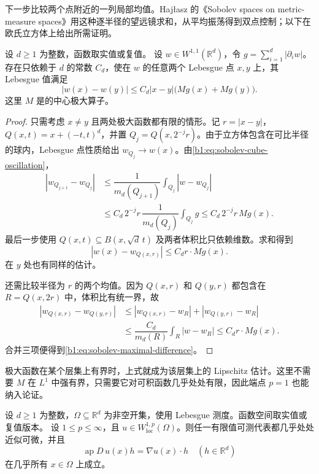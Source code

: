 下一步比较两个点附近的一列局部均值。Hajłasz 的《Sobolev spaces on metric-measure spaces》\cite[Section 9, Theorem 9.4]{Hajlasz2003SobolevMetric}用这种逐半径的望远镜求和，从平均振荡得到双点控制；以下在欧氏立方体上给出所需证明。

\begin{proposition}\label{b1:prop:sobolev-maximal-difference}
设 \(d\geq1\) 为整数，函数取实值或复值。
设 \(w\in W^{1,1}(\mathbb R^d)\)，令 \(g=\sum_{i=1}^d|\partial_iw|\)。存在只依赖于 \(d\) 的常数 \(C_d\)，使在 \(w\) 的任意两个 Lebesgue 点 \(x,y\) 上，其 Lebesgue 值满足
\begin{equation}\label{b1:eq:sobolev-maximal-difference}
 |w(x)-w(y)|\leq C_d|x-y|\bigl(Mg(x)+Mg(y)\bigr).
\end{equation}
这里 \(M\) 是的中心极大算子。
\end{proposition}
\begin{proof}
只需考虑 \(x\ne y\) 且两处极大函数都有限的情形。记 \(r=|x-y|\)，\(Q(x,t)=x+(-t,t)^d\)，并置 \(Q_j=Q(x,2^{-j}r)\)。由于立方体包含在可比半径的球内，Lebesgue 点性质给出 \(w_{Q_j}\rightarrow w(x)\)。由\eqref{b1:eq:sobolev-cube-oscillation}，
\[
 \begin{aligned}
 |w_{Q_{j+1}}-w_{Q_j}|
 &\leq\dfrac1{m_d(Q_{j+1})}\int_{Q_j}|w-w_{Q_j}|\\
 &\leq C_d\,2^{-j}r\,\dfrac1{m_d(Q_j)}\int_{Q_j}g
 \leq C_d\,2^{-j}r\,Mg(x).
 \end{aligned}
\]
最后一步使用 \(Q(x,t)\subseteq B(x,\sqrt d\,t)\) 及两者体积比只依赖维数。求和得到
\[
 |w(x)-w_{Q(x,r)}|\leq C_dr\cdot Mg(x).
\]
在 \(y\) 处也有同样的估计。

还需比较半径为 \(r\) 的两个均值。因为 \(Q(x,r)\) 和 \(Q(y,r)\) 都包含在 \(R=Q(x,2r)\) 中，体积比有统一界，故
\[
 \begin{aligned}
 |w_{Q(x,r)}-w_{Q(y,r)}|
 &\leq|w_{Q(x,r)}-w_R|+|w_{Q(y,r)}-w_R|\\
 &\leq\dfrac{C_d}{m_d(R)}\int_R|w-w_R|
 \leq C_dr\cdot Mg(x).
 \end{aligned}
\]
合并三项便得到\eqref{b1:eq:sobolev-maximal-difference}。
\end{proof}

极大函数在某个层集上有界时，上式就成为该层集上的 Lipschitz 估计。这里不需要 \(M\) 在 \(L^1\) 中强有界，只需要它对可积函数几乎处处有限，因此端点 \(p=1\) 也能纳入论证。

\begin{theorem}\label{b1:thm:sobolev-approximate-differentiability}
设 \(d\geq1\) 为整数，\(\Omega\subseteq\mathbb R^d\) 为非空开集，使用 Lebesgue 测度。函数空间取实值或复值版本。
设 \(1\leq p\leq\infty\)，且 \(u\in W^{1,p}_{\mathrm{loc}}(\Omega)\)。则任一有限值可测代表都几乎处处近似可微，并且
\[
 \operatorname{ap}D\,u(x)h=\nabla u(x)\cdot h
 \quad(h\in\mathbb R^d)
\]
在几乎所有 \(x\in\Omega\) 上成立。
\end{theorem}

